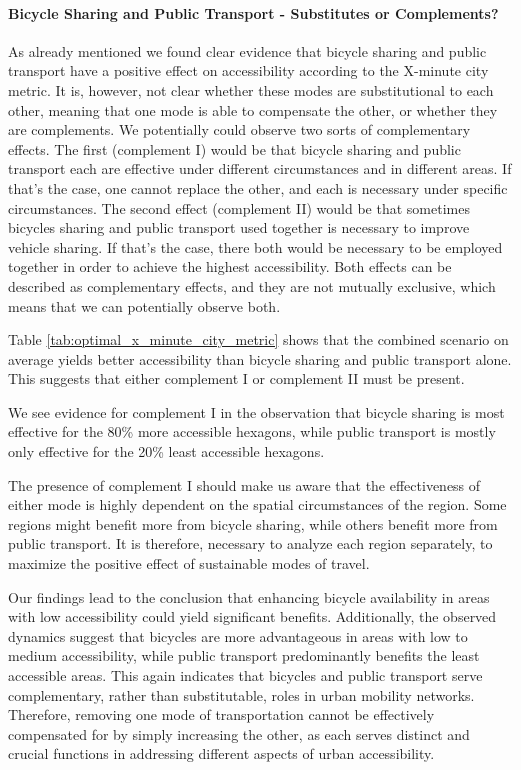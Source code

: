 \paragraph{Bicycle Sharing and Public Transport - Substitutes or Complements?}
As already mentioned we found clear evidence that bicycle sharing and public transport have a positive effect on accessibility according to the X-minute city metric.
It is, however, not clear whether these modes are substitutional to each other, meaning that one mode is able to compensate the other, or whether they are complements.
We potentially could observe two sorts of complementary effects.
The first (complement I) would be that bicycle sharing and public transport each are effective under different circumstances and in different areas.
If that's the case, one cannot replace the other, and each is necessary under specific circumstances.
The second effect (complement II) would be that sometimes bicycles sharing and public transport used together is necessary to improve vehicle sharing.
If that's the case, there both would be necessary to be employed together in order to achieve the highest accessibility.
Both effects can be described as complementary effects, and they are not mutually exclusive, which means that we can potentially observe both.


Table \ref{tab:optimal_x_minute_city_metric} shows that the combined scenario on average yields better accessibility than bicycle sharing and public transport alone.
This suggests that either complement I or complement II must be present.

We see evidence for complement I in the observation that bicycle sharing is most effective for the 80\% more accessible hexagons, while public transport is mostly only effective for the 20\% least accessible hexagons.



The presence of complement I should make us aware that the effectiveness of either mode is highly dependent on the spatial circumstances of the region.
Some regions might benefit more from bicycle sharing, while others benefit more from public transport.
It is therefore, necessary to analyze each region separately, to maximize the positive effect of sustainable modes of travel.



Our findings lead to the conclusion that enhancing bicycle availability in areas with low accessibility could yield significant benefits.
Additionally, the observed dynamics suggest that bicycles are more advantageous in areas with low to medium accessibility, while public transport predominantly benefits the least accessible areas.
This again indicates that bicycles and public transport serve complementary, rather than substitutable, roles in urban mobility networks.
Therefore, removing one mode of transportation cannot be effectively compensated for by simply increasing the other, as each serves distinct and crucial functions in addressing different aspects of urban accessibility.


